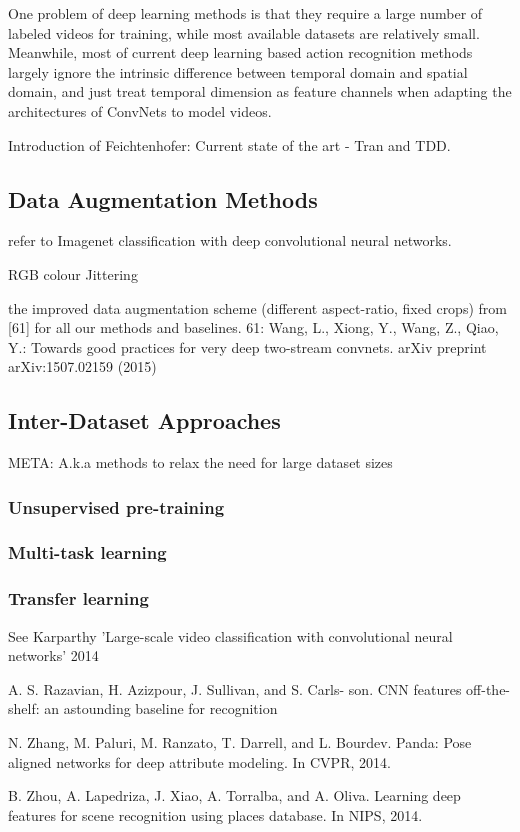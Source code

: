 One problem of deep learning methods is that they require a large number of labeled videos for training, while most available datasets are relatively small.
Meanwhile, most of current deep learning based action recognition methods largely ignore the intrinsic difference between temporal domain and spatial domain, and just treat temporal dimension as feature channels when adapting the architectures of ConvNets to model videos.

Introduction of Feichtenhofer: Current state of the art - Tran and TDD.

\subsection{Data Augmentation Methods}

refer to Imagenet classification with deep convolutional neural networks.

RGB colour Jittering

the improved data augmentation scheme (different aspect-ratio, fixed crops)
from [61] for all our methods and baselines.
61: Wang, L., Xiong, Y., Wang, Z., Qiao, Y.: Towards good practices for very
deep two-stream convnets. arXiv preprint arXiv:1507.02159 (2015)

\subsection{Inter-Dataset Approaches}
META: A.k.a methods to relax the need for large dataset sizes

\subsubsection{Unsupervised pre-training}

\subsubsection{Multi-task learning}

\subsubsection{Transfer learning}

See Karparthy 'Large-scale video classification with convolutional neural networks' 2014

A. S. Razavian, H. Azizpour, J. Sullivan, and S. Carls-
son. CNN features off-the-shelf: an astounding baseline for
recognition

N. Zhang, M. Paluri, M. Ranzato, T. Darrell, and L. Bourdev. Panda: Pose aligned networks for deep attribute modeling. In CVPR, 2014.

B. Zhou, A. Lapedriza, J. Xiao, A. Torralba, and A. Oliva. Learning deep features for scene recognition using places database. In NIPS, 2014.
